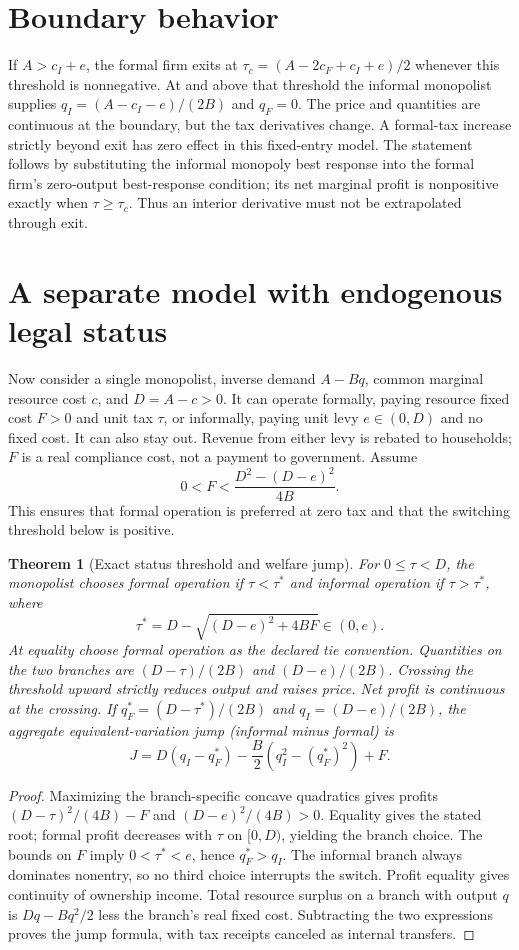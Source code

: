 \documentclass[11pt]{article}
\newtheorem{theorem}{Theorem}
\theoremstyle{remark}\newtheorem{remark}[theorem]{Remark}
\begin{document}
\section*{Boundary behavior}
If $A>c_I+e$, the formal firm exits at
$\tau_c=(A-2c_F+c_I+e)/2$ whenever this threshold is nonnegative. At and above that threshold the informal monopolist supplies
$q_I=(A-c_I-e)/(2B)$ and $q_F=0$. The price and quantities are continuous at the boundary, but the tax derivatives change. A formal-tax increase strictly beyond exit has zero effect in this fixed-entry model. The statement follows by substituting the informal monopoly best response into the formal firm's zero-output best-response condition; its net marginal profit is nonpositive exactly when $\tau\ge\tau_c$. Thus an interior derivative must not be extrapolated through exit.

\section*{A separate model with endogenous legal status}
Now consider a single monopolist, inverse demand $A-Bq$, common marginal resource cost $c$, and $D=A-c>0$. It can operate formally, paying resource fixed cost $F>0$ and unit tax $\tau$, or informally, paying unit levy $e\in(0,D)$ and no fixed cost. It can also stay out. Revenue from either levy is rebated to households; $F$ is a real compliance cost, not a payment to government. Assume
\[
 0<F<\frac{D^2-(D-e)^2}{4B}.
\]
This ensures that formal operation is preferred at zero tax and that the switching threshold below is positive.

\begin{theorem}[Exact status threshold and welfare jump]
For $0\le\tau<D$, the monopolist chooses formal operation if $\tau<\tau^*$ and informal operation if $\tau>\tau^*$, where
\[
 \tau^*=D-\sqrt{(D-e)^2+4BF}\in(0,e).
\]
At equality choose formal operation as the declared tie convention. Quantities on the two branches are $(D-\tau)/(2B)$ and $(D-e)/(2B)$. Crossing the threshold upward strictly reduces output and raises price. Net profit is continuous at the crossing. If $q_F^*=(D-\tau^*)/(2B)$ and $q_I=(D-e)/(2B)$, the aggregate equivalent-variation jump (informal minus formal) is
\[
 J=D(q_I-q_F^*)-\frac B2(q_I^2-(q_F^*)^2)+F.
\]
\end{theorem}
\begin{proof}
Maximizing the branch-specific concave quadratics gives profits $(D-\tau)^2/(4B)-F$ and $(D-e)^2/(4B)>0$. Equality gives the stated root; formal profit decreases with $\tau$ on $[0,D)$, yielding the branch choice. The bounds on $F$ imply $0<\tau^*<e$, hence $q_F^*>q_I$. The informal branch always dominates nonentry, so no third choice interrupts the switch. Profit equality gives continuity of ownership income. Total resource surplus on a branch with output $q$ is $Dq-Bq^2/2$ less the branch's real fixed cost. Subtracting the two expressions proves the jump formula, with tax receipts canceled as internal transfers.
\end{proof}
\end{document}

